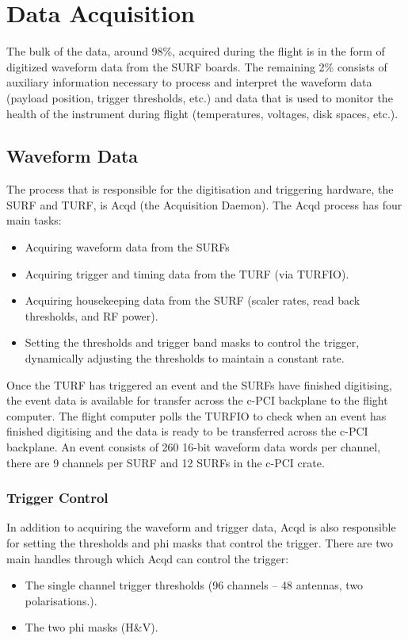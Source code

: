\documentclass{article}
\begin{document}
\section{Data Acquisition}
The bulk of the data, around 98\%, acquired during the flight is in the form of digitized waveform data from the SURF boards. The remaining 2\% consists of auxiliary information necessary to process and interpret the waveform data (payload position, trigger thresholds, etc.) and data that is used to monitor the health of the instrument during flight (temperatures, voltages, disk spaces, etc.).

\subsection{Waveform Data}
The process that is responsible for the digitisation and triggering hardware, the SURF and TURF, is Acqd (the Acquisition Daemon). The Acqd process has four main tasks:
\begin{itemize}
\item Acquiring waveform data from the SURFs
\item Acquiring trigger and timing data from the TURF (via TURFIO).
\item Acquiring housekeeping data from the SURF (scaler rates, read back thresholds, and RF power).
\item Setting the thresholds and trigger band masks to control the trigger, dynamically adjusting the thresholds to maintain a constant rate.
\end{itemize}

Once the TURF has triggered an event and the SURFs have finished digitising, the event data is available for transfer across the c-PCI backplane to the flight computer. The flight computer polls the TURFIO to check when an event has finished digitising and the data is ready to be transferred across the c-PCI backplane. An event consists of 260 16-bit waveform data words per channel, there are 9 channels per SURF and 12 SURFs in the c-PCI crate.

\subsubsection{Trigger Control}
In addition to acquiring the waveform and trigger data, Acqd is also responsible for setting the thresholds and phi masks that control the trigger.  There are two main handles through which Acqd can control the trigger:
\begin{itemize}
\item The single channel trigger thresholds (96 channels -- 48 antennas, two polarisations.).
\item The two phi masks (H\&V).
\end{itemize}
\end{document}

